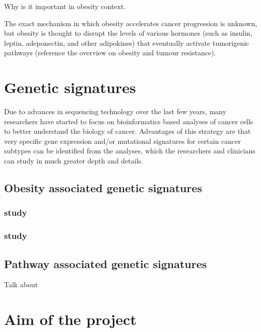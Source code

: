 Why is it important in obesity context.

The exact mechanism in which obesity accelerates cancer progression is unknown, but obesity is thought to disrupt the levels of various hormones (such as insulin, leptin, adeponectin, and other adipokines) that eventually activate tumorigenic pathways (reference the overview on obesity and tumour resistance).

\section{Genetic signatures}
\label{sec:genetic_signatures}

Due to advances in sequencing technology over the last few years, many researchers have started to focus on bioinformatics based analyses of cancer cells to better understand the biology of cancer.
Advantages of this strategy are that very specific gene expression and/or mutational signatures for certain cancer subtypes can be identified from the analyses, which the researchers and clinicians can study in much greater depth and details.


\subsection{Obesity associated genetic signatures}
\label{subsec:obesity_associated_genetic_signatures}

\subsubsection{ \textbf{\citet{Creighton2012} study}}
\label{ssub:creighton_study}



\subsubsection{ \textbf{\citet{Fuentes-Mattei2014} study}}
\label{ssub:fuentes_mattei_study}




\subsection{Pathway associated genetic signatures}
\label{sub:pathway_associated_genetic_signatures}

Talk about \citet{Gatza2010a}





\section{Aim of the project}
\label{sec:aim}




